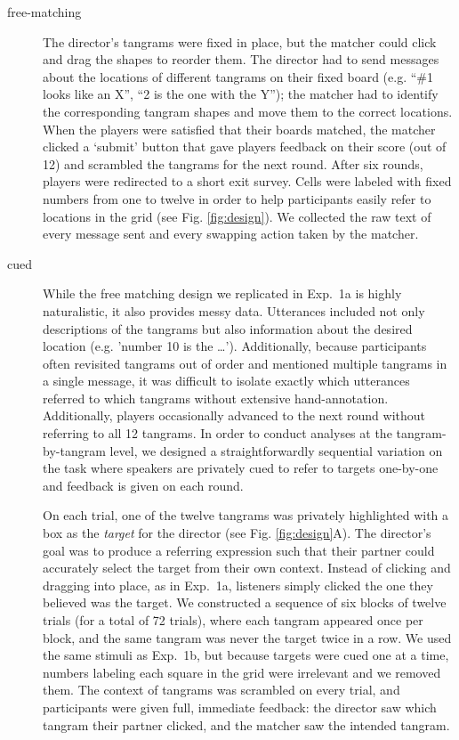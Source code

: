 \documentclass[alpha-refs]{wiley-article}
\begin{document}
\begin{description}
\item[free-matching] The director's tangrams were fixed in place, but the matcher could click and drag the shapes to reorder them. 
The director had to send messages about the locations of different tangrams on their fixed board (e.g. ``\#1 looks like an X'', ``2 is the one with the Y''); the matcher had to identify the corresponding tangram shapes and move them to the correct locations. 
When the players were satisfied that their boards matched, the matcher clicked a `submit' button that gave players feedback on their score (out of 12) and scrambled the tangrams for the next round. 
After six rounds, players were redirected to a short exit survey. 
Cells were labeled with fixed numbers from one to twelve in order to help participants easily refer to locations in the grid (see Fig. \ref{fig:design}).
We collected the raw text of every message sent
and every swapping action taken by the matcher.
\item[cued] While the free matching design we replicated in Exp.~1a is highly naturalistic, it also provides messy data. Utterances included not only descriptions of the tangrams but also information about the desired location (e.g. 'number 10 is the \dots'). Additionally, because participants often revisited tangrams out of order and mentioned multiple tangrams in a single message, it was difficult to isolate exactly which utterances referred to which tangrams without extensive hand-annotation. Additionally, players occasionally advanced to the next round without referring to all 12 tangrams. In order to conduct analyses at the tangram-by-tangram level, we designed a straightforwardly sequential variation on the task where speakers are privately cued to refer to targets one-by-one and feedback is given on each round. 

On each trial, one of the twelve tangrams was privately highlighted with a box as the \emph{target} for the director (see Fig. \ref{fig:design}A). The director's goal was to produce a referring expression such that their partner could accurately select the target from their own context. Instead of clicking and dragging into place, as in Exp.~1a, listeners simply clicked the one they believed was the target. We constructed a sequence of six blocks of twelve trials (for a total of 72 trials), where each tangram appeared once per block, and the same tangram was never the target twice in a row. We used the same stimuli as Exp.~1b, but because targets were cued one at a time, numbers labeling each square in the grid were irrelevant and we removed them. The context of tangrams was scrambled on every trial, and participants were given full, immediate feedback: the director saw which tangram their partner clicked, and the matcher saw the intended tangram.

\end{description}
\end{document}
